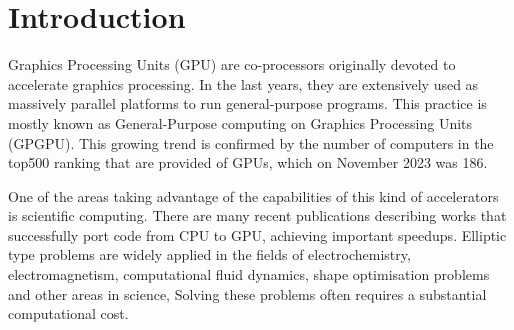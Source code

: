 \section{Introduction}



Graphics Processing Units (GPU) are co-processors originally devoted to accelerate graphics processing. In the last years, they are extensively used as massively parallel platforms to run general-purpose programs. This practice is mostly known as General-Purpose computing on Graphics Processing Units (GPGPU). This growing trend is confirmed by the number of computers in the top500 ranking that are provided of GPUs, which on November 2023 was 186\cite{Top500}.

One of the areas taking advantage of the capabilities of this kind of accelerators is scientific computing. There are many recent publications describing works that successfully port code from CPU to GPU, achieving important speedups\cite{Navarro2014,Hwu2012}. Elliptic type problems are widely applied in the fields of electrochemistry\cite{QIAN2021109908,DING2019108864}, electromagnetism\cite{Chai2023}, computational fluid dynamics\cite{Greengard1998318, Quartapelle1993NumericalSO}, shape optimisation problems\cite{ZHU2011752,gong2023} and other areas in science\cite{Chapko199747,ZHOU20061,CHENG2006616,SUN2014445},  Solving these problems often requires a substantial computational cost\cite{GarciaRisueno2014}.

